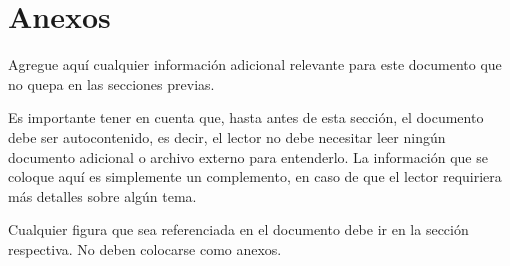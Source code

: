 \section{Anexos}
Agregue aquí cualquier información adicional relevante para este documento que no quepa en las secciones previas.

Es importante tener en cuenta que, hasta antes de esta sección, el documento debe ser autocontenido, es decir, el lector no debe necesitar leer ningún documento adicional o archivo externo para entenderlo. La información que se coloque aquí es simplemente un complemento, en caso de que el lector requiriera más detalles sobre algún tema.

Cualquier figura que sea referenciada en el documento debe ir en la sección respectiva. No deben colocarse como anexos.
